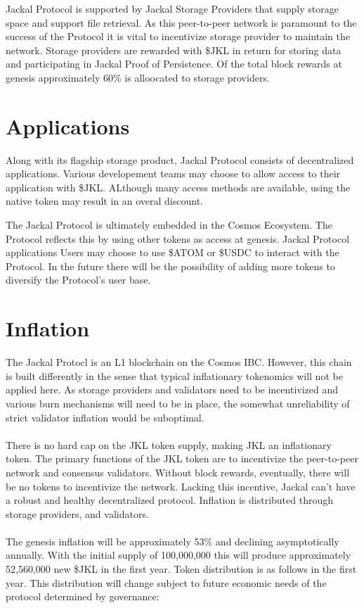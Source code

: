 \documentclass[11pt, nofootinbib]{article}
\begin{document}
Jackal Protocol is supported by Jackal Storage Providers that supply storage space and support file
retrieval. As this peer-to-peer network is paramount to the success of the Protocol it is vital to incentivize
storage provider to maintain the network. Storage providers are rewarded with \$JKL in return for storing data and participating in Jackal Proof of Persistence.
Of the total block rewards at genesis approximately 60\% is alloocated to storage providers.

\section{Applications}

Along with its flagship storage product, Jackal Protocol consists of decentralized applications.  
Various developement teams may choose to allow access to their application with \$JKL.  ALthough many access methods are available,
using the native token may result in an overal discount.

\noindent The Jackal Protocol is ultimately embedded in the Cosmos Ecosystem. The Protocol reflects this by using other tokens 
as access at genesis. Jackal Protocol applications  Users may choose to use \$ATOM or 
\$USDC to interact with the Protocol. In the future there will be the possibility of adding more tokens to diversify
the Protocol's user base.

\section{Inflation}

The Jackal Protocl is an L1 blockchain on the Cosmos IBC. However, this chain is built differently in the sense that typical
inflationary tokenomics will not be applied here. As storage providers and validators need to be incentivized and various burn
mechanisms will need to be in place, the somewhat unreliability of strict validator inflation would be
suboptimal.
\\~\\
\noindent There is no hard cap on the JKL token supply, making JKL an inflationary token. The primary functions of the JKL token are to 
incentivize the peer-to-peer network and consensus validators. Without block rewards, eventually, there will be no tokens to incentivize 
the network. Lacking this incentive, Jackal can’t have a robust and healthy decentralized protocol. Inflation is distributed through storage providers, 
and validators. 
\\~\\
\noindent The genesis inflation will be approximately 53\% and declining asymptotically annually. With
the initial supply of 100,000,000 this will produce approximately 52,560,000 new \$JKL in the first year. Token
distribution is as follows in the first year. This distribution will change subject to future economic needs of
the protocol determined by governance:
\end{document}

